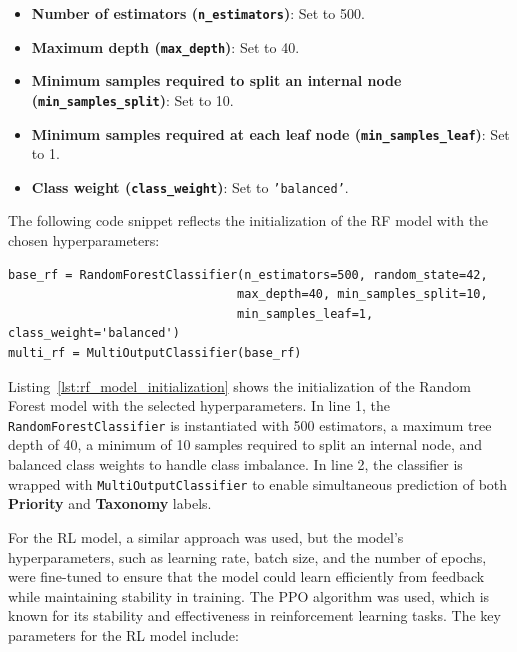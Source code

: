 \begin{itemize}
    \item \textbf{Number of estimators (\texttt{n\_estimators})}: Set to 500.
    \item \textbf{Maximum depth (\texttt{max\_depth})}: Set to 40.
    \item \textbf{Minimum samples required to split an internal node (\texttt{min\_samples\_split})}: Set to 10.
    \item \textbf{Minimum samples required at each leaf node (\texttt{min\_samples\_leaf})}: Set to 1.
    \item \textbf{Class weight (\texttt{class\_weight})}: Set to \texttt{'balanced'}.
\end{itemize}

The following code snippet reflects the initialization of the RF model with the chosen hyperparameters:

\vspace{0.2cm}
\noindent
\begin{minipage}{\linewidth}
\begin{verbatim}
base_rf = RandomForestClassifier(n_estimators=500, random_state=42, 
                                max_depth=40, min_samples_split=10, 
                                min_samples_leaf=1, class_weight='balanced')
multi_rf = MultiOutputClassifier(base_rf)
\end{verbatim}
\label{lst:rf_model_initialization}
\end{minipage}
\vspace{0.1cm}

Listing~\ref{lst:rf_model_initialization} shows the initialization of the Random Forest model with the selected hyperparameters. 
In line 1, the \texttt{RandomForestClassifier} is instantiated with 500 estimators, a maximum tree depth of 40, a minimum of 10 samples required to split an internal node, and balanced class weights to handle class imbalance. 
In line 2, the classifier is wrapped with \texttt{MultiOutputClassifier} to enable simultaneous prediction of both \textbf{Priority} and \textbf{Taxonomy} labels.

For the \gls{RL} model, a similar approach was used, but the model's hyperparameters, such as learning rate, batch size, and the number of epochs, were fine-tuned to ensure that the model could learn efficiently from feedback while maintaining stability in training. 
The PPO algorithm was used, which is known for its stability and effectiveness in reinforcement learning tasks. 
The key parameters for the \gls{RL} model include:

